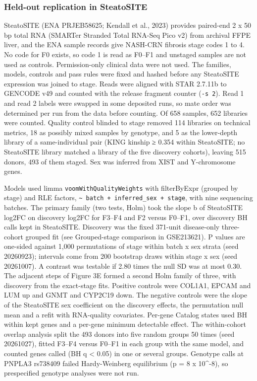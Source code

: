 \subsubsection{Held-out replication in SteatoSITE}\label{held-out-replication-in-steatosite}

SteatoSITE (ENA PRJEB58625; Kendall et al., 2023) provides paired-end 2 x 50 bp total RNA (SMARTer Stranded Total RNA-Seq Pico v2) from archival FFPE liver, and the ENA sample records give NASH-CRN fibrosis stage codes 1 to 4. No code for F0 exists, so code 1 is read as F0--F1 and unstaged samples are not used as controls. Permission-only clinical data were not used. The families, models, controls and pass rules were fixed and hashed before any SteatoSITE expression was joined to stage. Reads were aligned with STAR 2.7.11b to GENCODE v49 and counted with the release fragment counter (\texttt{-s\ 2}). Read 1 and read 2 labels were swapped in some deposited runs, so mate order was determined per run from the data before counting. Of 658 samples, 652 libraries were counted. Quality control blinded to stage removed 114 libraries on technical metrics, 18 as possibly mixed samples by genotype, and 5 as the lower-depth library of a same-individual pair (KING kinship ≥ 0.354 within SteatoSITE; no SteatoSITE library matched a library of the five discovery cohorts), leaving 515 donors, 493 of them staged. Sex was inferred from XIST and Y-chromosome genes.

Models used limma \texttt{voomWithQualityWeights} with filterByExpr (grouped by stage) and RLE factors, \texttt{\textasciitilde{}\ batch\ +\ inferred\_\allowbreak{}sex\ +\ stage}, with nine sequencing batches. The primary family (two tests, Holm) took the slope b of SteatoSITE log2FC on discovery log2FC for F3--F4 and F2 versus F0--F1, over discovery BH calls kept in SteatoSITE. Discovery was the fixed 371-unit disease-only three-cohort grouped fit (see Grouped-stage comparison in GSE213621). P values are one-sided against 1,000 permutations of stage within batch x sex strata (seed 20260923); intervals come from 200 bootstrap draws within stage x sex (seed 20261007). A contrast was testable if 2.80 times the null SD was at most 0.30. The adjacent steps of Figure 3E formed a second Holm family of three, with discovery from the exact-stage fits. Positive controls were COL1A1, EPCAM and LUM up and GNMT and CYP2C19 down. The negative controls were the slope of the SteatoSITE sex coefficient on the discovery effects, the permutation null mean and a refit with RNA-quality covariates. Per-gene Catalog states used BH within kept genes and a per-gene minimum detectable effect. The within-cohort overlap analysis split the 493 donors into five random groups 50 times (seed 20261027), fitted F3--F4 versus F0--F1 in each group with the same model, and counted genes called (BH q \textless{} 0.05) in one or several groups. Genotype calls at PNPLA3 rs738409 failed Hardy-Weinberg equilibrium (p = 8 x 10\^{}-8), so prespecified genotype analyses were not run.

